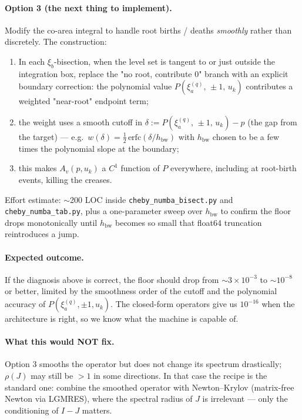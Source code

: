 \documentclass[11pt]{article}
\begin{document}
\paragraph{Option 3 (the next thing to implement).}
Modify the co-area integral to handle root births / deaths \emph{smoothly}
rather than discretely. The construction:
\begin{enumerate}
  \item In each $\xi_b$-bisection, when the level set is tangent to or just
        outside the integration box, replace the "no root, contribute 0"
        branch with an explicit boundary correction: the polynomial value
        $P(\xi_a^{(q)},\,\pm 1,\,u_k)$ contributes a weighted "near-root"
        endpoint term;
  \item the weight uses a smooth cutoff in
        $\delta := P(\xi_a^{(q)},\,\pm 1,\,u_k) - p$
        (the gap from the target) --- e.g.\ $w(\delta)=
        \tfrac{1}{2}\,\mathrm{erfc}(\delta / h_{\mathrm{bw}})$
        with $h_{\mathrm{bw}}$ chosen to be a few times the polynomial slope
        at the boundary;
  \item this makes $A_v(p, u_k)$ a $C^1$ function of $P$ everywhere,
        including at root-birth events, killing the creases.
\end{enumerate}
Effort estimate: $\sim$200 LOC inside \texttt{cheby\_numba\_bisect.py} and
\texttt{cheby\_numba\_tab.py}, plus a one-parameter sweep over $h_{\mathrm{bw}}$
to confirm the floor drops monotonically until $h_{\mathrm{bw}}$ becomes so
small that float64 truncation reintroduces a jump.

\paragraph{Expected outcome.} If the diagnosis above is correct, the floor
should drop from $\sim 3\!\times\!10^{-3}$ to $\sim 10^{-8}$ or better, limited
by the smoothness order of the cutoff and the polynomial accuracy of
$P(\xi_a^{(q)}, \pm 1, u_k)$. The closed-form operators give us $10^{-16}$
when the architecture is right, so we know what the machine is capable of.

\paragraph{What this would NOT fix.}
Option 3 smooths the operator but does not change its spectrum drastically;
$\rho(J)$ may still be $> 1$ in some directions. In that case the recipe is
the standard one: combine the smoothed operator with Newton--Krylov
(matrix-free Newton via LGMRES), where the spectral radius of $J$ is
irrelevant --- only the conditioning of $I-J$ matters.
\end{document}
